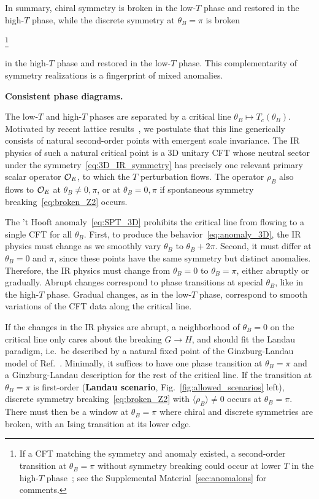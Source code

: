 \documentclass[
 reprint,







nofootinbib,


 amsmath,amssymb,
 aps,
 prd






tightenlines
]{revtex4-2}
\begin{document}
In summary, chiral symmetry is broken in the low-$T$ phase and restored
in the high-$T$ phase, while the discrete symmetry at $\theta_B=\pi$ is
broken

\footnote{
If a CFT matching the symmetry and anomaly existed, a second-order transition at $\theta_B=\pi$ without symmetry breaking could occur at lower $T$ in the high-$T$ phase~\cite{Xu:2011sj,Yonekura:2019vyz,Nishimura:2019umw,Kobayashi:2023ajk}; see the Supplemental Material~\ref{sec:anomalons} for comments.}

in the high-$T$ phase and restored in the low-$T$ phase. This
complementarity of symmetry realizations is a fingerprint of mixed
anomalies.



{\bf Consistent phase diagrams.}


The low-$T$ and high-$T$ phases are separated by a critical line
$\theta_B \mapsto T_c(\theta_B)$. Motivated by recent lattice
results~\cite{Cuteri:2021ikv,Dini:2021hug,Nakamura:2022abk,Zhang:2022kzb,Zhang:2024ldl,Zhang:2025vns,Klinger:2025xxb,DAmbrosio:2025ldv,Klinger:2026pbe},
we postulate that this line generically consists of natural second-order
points with emergent scale invariance.
The IR physics of such a natural critical point is a 3D unitary CFT whose neutral
sector under the symmetry~\eqref{eq:3D_IR_symmetry} has precisely one
relevant primary scalar operator $\mathcal{O}_{E}$, to which the $T$
perturbation flows. The operator $\rho_B$ also flows to
$\mathcal{O}_{E}$ at $\theta_B \neq 0,\pi$, or at $\theta_B = 0,\pi$ if
spontaneous symmetry breaking~\eqref{eq:broken_Z2} occurs.

The 't Hooft anomaly~\eqref{eq:SPT_3D} prohibits the critical line from
flowing to a single CFT for all $\theta_B$. First, to produce
the behavior~\eqref{eq:anomaly_3D}, the IR physics must change as we
smoothly vary $\theta_B$ to $\theta_B+2\pi$. Second, it must differ at
$\theta_B=0$ and $\pi$, since these points have the same symmetry but
distinct anomalies. Therefore, the IR physics must change from
$\theta_B=0$ to $\theta_B=\pi$, either abruptly or gradually. Abrupt
changes correspond to phase transitions at special $\theta_B$, like in
the high-$T$ phase. Gradual changes, as in the low-$T$ phase,
correspond to smooth variations of the CFT data along the critical line.

If the changes in the IR physics are abrupt, a neighborhood of
$\theta_B=0$ on the critical line only cares about the breaking
$G \to H$, and should fit the Landau paradigm, i.e.~be described by a
natural fixed point of the Ginzburg-Landau model of
Ref.~\cite{Pisarski:1983ms}. Minimally, it suffices to have one
phase transition at $\theta_B = \pi$ and a
Ginzburg-Landau description for the rest of the critical line.
If the transition at $\theta_B = \pi$ is first-order ({\bf Landau
scenario}, Fig.~\ref{fig:allowed_scenarios} left), discrete
symmetry breaking~\eqref{eq:broken_Z2} with $\langle\rho_B\rangle\neq0$ occurs at $\theta_B = \pi$. There must then be a
window at $\theta_B=\pi$ where chiral and discrete symmetries are
broken, with an Ising transition at its lower edge.
\end{document}
